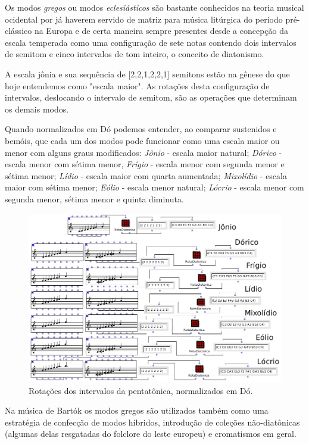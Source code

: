 \documentclass[
	12pt,				%
	openright,			%
	twoside,			%
	a4paper,			%
	english,			%
	french,				%
	spanish,			%
	brazil				%
	]{abntex2}
\begin{document}
Os modos \textit{gregos} ou modos \textit{eclesiásticos} são bastante conhecidos na teoria musical ocidental por já haverem servido de matriz para música litúrgica do período pré-clássico na Europa e de certa maneira sempre presentes desde a concepção da escala temperada como uma configuração de sete notas contendo dois intervalos de semitom e cinco intervalos de tom inteiro, o conceito de diatonismo. 

A escala jônia e sua sequência de [2,2,1,2,2,1] semitons estão na gênese do que hoje entendemos como "escala maior". As rotações desta configuração de intervalos, deslocando o intervalo de semitom, são as operações que determinam os demais modos. 

Quando normalizados em Dó podemos entender, ao comparar sustenidos e bemóis, que cada um dos modos pode funcionar como uma escala maior ou menor com alguns graus modificados: \textit{Jônio} - escala maior natural; \textit{Dórico} -   escala menor com sétima menor, \textit{Frígio} - escala menor com segunda menor e sétima menor; \textit{Lídio} - escala maior com quarta aumentada; \textit{Mixolídio} - escala maior com sétima menor; \textit{Eólio} - escala menor natural; \textit{Lócrio} - escala menor com segunda menor, sétima menor e quinta diminuta.

\begin{figure}[!h]
	\caption{\label{fig_grafico}Rotações dos intervalos da pentatônica, normalizados em Dó. }
	\begin{center}
	    \includegraphics[scale=0.5]{modal/modal.png}
	\end{center}
\end{figure}


Na música de Bartók os modos gregos são utilizados também como uma estratégia de confecção de modos híbridos, introdução de coleções não-diatônicas (algumas delas resgatadas do folclore do leste europeu) e cromatismos em geral.
\end{document}
